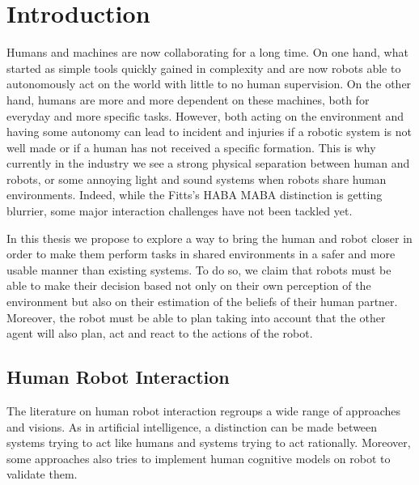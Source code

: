 \documentclass[a4paper,11pt,twoside]{StyleThese}
\begin{document}
\fi


\chapter*{Introduction}
Humans and machines are now collaborating for a long time. On one hand, what started as simple tools quickly gained in complexity and are now robots able to autonomously act on the world with little to no human supervision. On the other hand, humans are more and more dependent on these machines, both for everyday and more specific tasks.
However, both acting on the environment and having some autonomy can lead to incident and injuries if a robotic system is not well made or if a human has not received a specific formation. This is why currently in the industry we see a strong physical separation between human and robots, or some annoying light and sound systems when robots share human environments. Indeed, while the Fitts's HABA MABA \cite{fitts_human_1951} distinction is getting blurrier, some major interaction challenges have not been tackled yet.

In this thesis we propose to explore a way to bring the human and robot closer in order to make them perform tasks in shared environments in a safer and more usable manner than existing systems. To do so, we claim that robots must be able to make their decision based not only on their own perception of the environment but also on their estimation of the beliefs of their human partner. Moreover, the robot must be able to plan taking into account that the other agent will also plan, act and react to the actions of the robot.

\section*{Human Robot Interaction}
The literature on human robot interaction regroups a wide range of approaches and visions. As in artificial intelligence, a distinction can be made between systems trying to act like humans and systems trying to act rationally. Moreover, some approaches also tries to implement human cognitive models on robot to validate them. %
\end{document}
